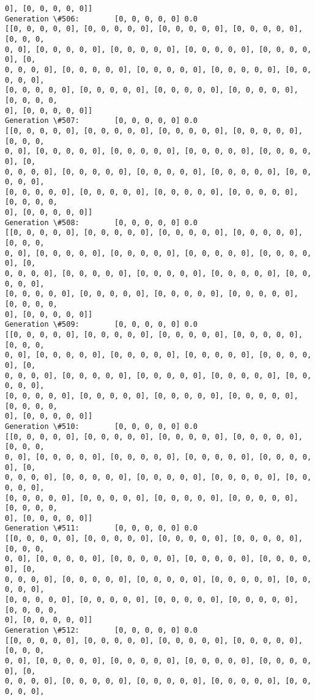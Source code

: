 \documentclass[11pt]{article}
\begin{document}
\begin{Verbatim}[commandchars=\\\{\}]
0], [0, 0, 0, 0, 0]]
Generation \#506:        [0, 0, 0, 0, 0] 0.0
[[0, 0, 0, 0, 0], [0, 0, 0, 0, 0], [0, 0, 0, 0, 0], [0, 0, 0, 0, 0], [0, 0, 0,
0, 0], [0, 0, 0, 0, 0], [0, 0, 0, 0, 0], [0, 0, 0, 0, 0], [0, 0, 0, 0, 0], [0,
0, 0, 0, 0], [0, 0, 0, 0, 0], [0, 0, 0, 0, 0], [0, 0, 0, 0, 0], [0, 0, 0, 0, 0],
[0, 0, 0, 0, 0], [0, 0, 0, 0, 0], [0, 0, 0, 0, 0], [0, 0, 0, 0, 0], [0, 0, 0, 0,
0], [0, 0, 0, 0, 0]]
Generation \#507:        [0, 0, 0, 0, 0] 0.0
[[0, 0, 0, 0, 0], [0, 0, 0, 0, 0], [0, 0, 0, 0, 0], [0, 0, 0, 0, 0], [0, 0, 0,
0, 0], [0, 0, 0, 0, 0], [0, 0, 0, 0, 0], [0, 0, 0, 0, 0], [0, 0, 0, 0, 0], [0,
0, 0, 0, 0], [0, 0, 0, 0, 0], [0, 0, 0, 0, 0], [0, 0, 0, 0, 0], [0, 0, 0, 0, 0],
[0, 0, 0, 0, 0], [0, 0, 0, 0, 0], [0, 0, 0, 0, 0], [0, 0, 0, 0, 0], [0, 0, 0, 0,
0], [0, 0, 0, 0, 0]]
Generation \#508:        [0, 0, 0, 0, 0] 0.0
[[0, 0, 0, 0, 0], [0, 0, 0, 0, 0], [0, 0, 0, 0, 0], [0, 0, 0, 0, 0], [0, 0, 0,
0, 0], [0, 0, 0, 0, 0], [0, 0, 0, 0, 0], [0, 0, 0, 0, 0], [0, 0, 0, 0, 0], [0,
0, 0, 0, 0], [0, 0, 0, 0, 0], [0, 0, 0, 0, 0], [0, 0, 0, 0, 0], [0, 0, 0, 0, 0],
[0, 0, 0, 0, 0], [0, 0, 0, 0, 0], [0, 0, 0, 0, 0], [0, 0, 0, 0, 0], [0, 0, 0, 0,
0], [0, 0, 0, 0, 0]]
Generation \#509:        [0, 0, 0, 0, 0] 0.0
[[0, 0, 0, 0, 0], [0, 0, 0, 0, 0], [0, 0, 0, 0, 0], [0, 0, 0, 0, 0], [0, 0, 0,
0, 0], [0, 0, 0, 0, 0], [0, 0, 0, 0, 0], [0, 0, 0, 0, 0], [0, 0, 0, 0, 0], [0,
0, 0, 0, 0], [0, 0, 0, 0, 0], [0, 0, 0, 0, 0], [0, 0, 0, 0, 0], [0, 0, 0, 0, 0],
[0, 0, 0, 0, 0], [0, 0, 0, 0, 0], [0, 0, 0, 0, 0], [0, 0, 0, 0, 0], [0, 0, 0, 0,
0], [0, 0, 0, 0, 0]]
Generation \#510:        [0, 0, 0, 0, 0] 0.0
[[0, 0, 0, 0, 0], [0, 0, 0, 0, 0], [0, 0, 0, 0, 0], [0, 0, 0, 0, 0], [0, 0, 0,
0, 0], [0, 0, 0, 0, 0], [0, 0, 0, 0, 0], [0, 0, 0, 0, 0], [0, 0, 0, 0, 0], [0,
0, 0, 0, 0], [0, 0, 0, 0, 0], [0, 0, 0, 0, 0], [0, 0, 0, 0, 0], [0, 0, 0, 0, 0],
[0, 0, 0, 0, 0], [0, 0, 0, 0, 0], [0, 0, 0, 0, 0], [0, 0, 0, 0, 0], [0, 0, 0, 0,
0], [0, 0, 0, 0, 0]]
Generation \#511:        [0, 0, 0, 0, 0] 0.0
[[0, 0, 0, 0, 0], [0, 0, 0, 0, 0], [0, 0, 0, 0, 0], [0, 0, 0, 0, 0], [0, 0, 0,
0, 0], [0, 0, 0, 0, 0], [0, 0, 0, 0, 0], [0, 0, 0, 0, 0], [0, 0, 0, 0, 0], [0,
0, 0, 0, 0], [0, 0, 0, 0, 0], [0, 0, 0, 0, 0], [0, 0, 0, 0, 0], [0, 0, 0, 0, 0],
[0, 0, 0, 0, 0], [0, 0, 0, 0, 0], [0, 0, 0, 0, 0], [0, 0, 0, 0, 0], [0, 0, 0, 0,
0], [0, 0, 0, 0, 0]]
Generation \#512:        [0, 0, 0, 0, 0] 0.0
[[0, 0, 0, 0, 0], [0, 0, 0, 0, 0], [0, 0, 0, 0, 0], [0, 0, 0, 0, 0], [0, 0, 0,
0, 0], [0, 0, 0, 0, 0], [0, 0, 0, 0, 0], [0, 0, 0, 0, 0], [0, 0, 0, 0, 0], [0,
0, 0, 0, 0], [0, 0, 0, 0, 0], [0, 0, 0, 0, 0], [0, 0, 0, 0, 0], [0, 0, 0, 0, 0],

\end{Verbatim}
\end{document}
